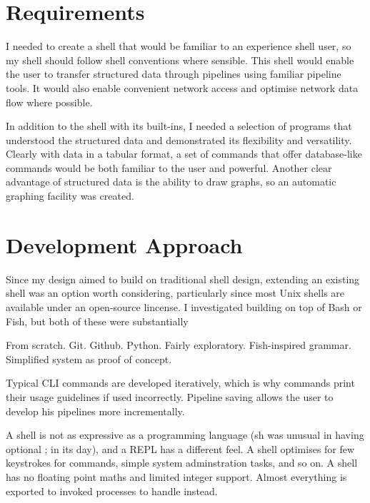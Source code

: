\documentclass[12pt,twoside,notitlepage]{report}
\begin{document}
\section{Requirements}
I needed to create a shell that would be familiar to an experience shell
user, so my shell should follow shell conventions where sensible. This shell
would enable the user to transfer structured data through pipelines using
familiar pipeline tools. It would also enable convenient network access and
optimise network data flow where possible.

In addition to the shell with its built-ins, I needed a selection of programs
that understood the structured data and demonstrated its flexibility and
versatility. Clearly with data in a tabular format, a set of commands that offer
database-like commands would be both familiar to the user and powerful. Another
clear advantage of structured data is the ability to draw graphs, so an
automatic graphing facility was created.


\section{Development Approach}
Since my design aimed to build on traditional shell design, extending an
existing shell was an option worth considering, particularly since most Unix
shells are available under an open-source lincense. I investigated building on
top of Bash or Fish, but both of these were substantially 



From scratch. Git. Github. Python. Fairly exploratory. Fish-inspired
grammar. Simplified system as proof of concept.

Typical CLI commands are developed iteratively, which is why commands print
their usage guidelines if used incorrectly. Pipeline saving allows the user to
develop his pipelines more incrementally.

A shell is not as expressive as a programming language (sh was unusual in having
optional ; in its day), and a REPL has a different feel. A shell optimises for
few keystrokes for commands, simple system adminstration tasks, and so on. A
shell has no floating point maths and limited integer support. Almost everything
is exported to invoked processes to handle instead.
\end{document}
